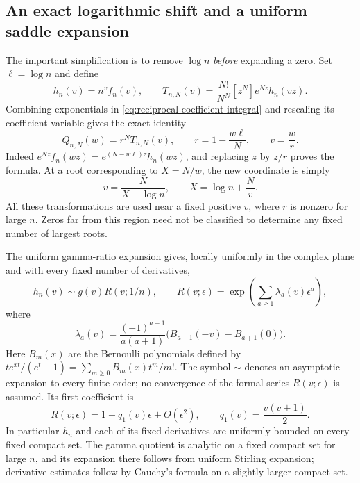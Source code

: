 \subsection{An exact logarithmic shift and a uniform saddle expansion}

The important simplification is to remove $\log n$ \emph{before}
expanding a zero.  Set $\ell=\log n$ and define
\begin{equation}\label{eq:log-shifted-transform}
 h_n(v)=n^v f_n(v),\qquad
 T_{n,N}(v)=\frac{N!}{N^N}[z^N]e^{Nz}h_n(vz).
\end{equation}
Combining exponentials in \eqref{eq:reciprocal-coefficient-integral}
and rescaling its coefficient variable gives the exact identity
\begin{equation}\label{eq:exact-logarithmic-shift}
 Q_{n,N}(w)=r^N T_{n,N}(v),\qquad
 r=1-\frac{w\ell}{N},\qquad v=\frac wr.
\end{equation}
Indeed $e^{Nz}f_n(wz)=e^{(N-w\ell)z}h_n(wz)$, and replacing
$z$ by $z/r$ proves the formula.  At a root corresponding to
$X=N/w$, the new coordinate is simply
\begin{equation}\label{eq:shifted-reciprocal-coordinate}
 v=\frac{N}{X-\log n},\qquad X=\log n+\frac Nv.
\end{equation}
All these transformations are used near a fixed positive $v$, where
$r$ is nonzero for large $n$.  Zeros far from this region need not
be classified to determine any fixed number of largest roots.

The uniform gamma-ratio expansion \cite[\S5.11]{DLMFGamma} gives,
locally uniformly in the complex plane and with every fixed number
of derivatives,
\begin{equation}\label{eq:gamma-ratio-full}
 h_n(v)\sim g(v)R(v;1/n),\qquad
 R(v;\epsilon)=\exp\left(\sum_{a\geq1}\lambda_a(v)\epsilon^a\right),
\end{equation}
where
\begin{equation}\label{eq:gamma-ratio-Bernoulli}
 \lambda_a(v)=\frac{(-1)^{a+1}}{a(a+1)}
      \bigl(B_{a+1}(-v)-B_{a+1}(0)\bigr).
\end{equation}
Here $B_m(x)$ are the Bernoulli polynomials defined by
$t e^{xt}/(e^t-1)=\sum_{m\geq0}B_m(x)t^m/m!$.
The symbol $\sim$ denotes an asymptotic expansion to every finite
order; no convergence of the formal series $R(v;\epsilon)$ is
assumed.  Its first coefficient is
\begin{equation}\label{eq:gamma-ratio-edge}
 R(v;\epsilon)=1+q_1(v)\epsilon+O(\epsilon^2),\qquad
 q_1(v)=\frac{v(v+1)}2.
\end{equation}
In particular $h_n$ and each of its fixed derivatives are uniformly
bounded on every fixed compact set.  The gamma quotient is analytic
on a fixed compact set for large $n$, and its expansion there follows
from uniform Stirling expansion; derivative estimates follow by
Cauchy's formula on a slightly larger compact set.

